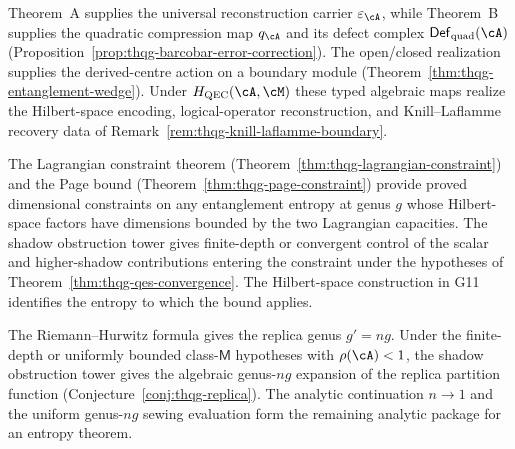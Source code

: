 \begin{conjecture}
\ClaimStatusConjectured
\label{conj:thqg-g14-target}
Theorem~A supplies the universal reconstruction carrier
$\varepsilon_\cA$, while Theorem~B supplies the quadratic compression
map $q_\cA$ and its defect complex
$\mathsf{Def}_{\mathrm{quad}}(\cA)$
(Proposition~\ref{prop:thqg-barcobar-error-correction}).
The open/closed realization supplies the derived-centre action on a
boundary module (Theorem~\ref{thm:thqg-entanglement-wedge}).  Under
$H_{\mathrm{QEC}}(\cA,\cM)$ these typed algebraic maps realize the
Hilbert-space encoding, logical-operator reconstruction, and
Knill--Laflamme recovery data of
Remark~\ref{rem:thqg-knill-laflamme-boundary}.
\end{conjecture}

\begin{conjecture}
\ClaimStatusConjectured
\label{conj:thqg-g15-target}
The Lagrangian constraint theorem
(Theorem~\ref{thm:thqg-lagrangian-constraint})
and the Page bound
(Theorem~\ref{thm:thqg-page-constraint})
provide proved dimensional constraints on any entanglement
entropy at genus $g$ whose Hilbert-space factors have dimensions
bounded by the two Lagrangian capacities. The shadow obstruction
tower gives finite-depth or convergent control of the scalar and
higher-shadow contributions entering the constraint under the
hypotheses of Theorem~\ref{thm:thqg-qes-convergence}.  The
Hilbert-space construction in G11 identifies the entropy to which the
bound applies.
\end{conjecture}

\begin{conjecture}
\ClaimStatusConjectured
\label{conj:thqg-g16-target}
The Riemann--Hurwitz formula gives the replica genus $g'=ng$.
Under the finite-depth or uniformly bounded class-$\mathsf M$
hypotheses with $\rho(\cA)<1$, the shadow obstruction tower gives
the algebraic genus-$ng$ expansion of the replica partition function
(Conjecture~\ref{conj:thqg-replica}).  The analytic continuation
$n\to1$ and the uniform genus-$ng$ sewing evaluation form the
remaining analytic package for an entropy theorem.
\end{conjecture}

